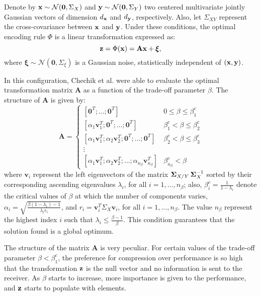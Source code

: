 Denote by $\mathbf{x}\sim \mathcal{N}(\mathbf{0}, \Sigma_{X})$ and $\mathbf{y}\sim \mathcal{N}(\mathbf{0}, \Sigma_{Y})$ two centered multivariate jointly Gaussian vectors of dimension $d_{\mathbf{x}}$ and $d_{\mathbf{y}}$, respectively. Also, let $\Sigma_{XY}$ represent the cross-covariance between $\mathbf{x}$ and $\mathbf{y}$. Under these conditions, the optimal encoding rule $\Phi$ is a linear transformation \cite{Chechik2004GIB} expressed as:
\begin{equation}
    \mathbf{z} = \Phi(\mathbf{x})  = \mathbf{A} \mathbf{x} + \boldsymbol{\xi},
\end{equation}
where $\boldsymbol{\xi} \sim  \mathcal{N}(\mathbf{0}, \Sigma_{\xi})$ is a Gaussian noise, statistically independent of $(\mathbf{x}, \mathbf{y})$.

In this configuration, Chechik et al. \cite{Chechik2004GIB} were able to evaluate the optimal transformation matrix $\mathbf{A}$ as a function of the trade-off parameter $\beta$. The structure of $\mathbf{A}$ is given by:
\begin{equation}
\mathbf{A} = \left\{\begin{matrix}
            [\mathbf{0}^T;...;\mathbf{0}^T] & 0 \leq \beta \leq \beta_1^c\\
            [\alpha_1\mathbf{v}_1^T; \mathbf{0}^T;...;\mathbf{0}^T] & \beta_1^c < \beta \leq \beta_2^c\\
            [\alpha_1 \mathbf{v}_1^T;\alpha_2\mathbf{v}_2^T;\mathbf{0}^T;\ldots;\mathbf{0}^T] & \beta_2^c < \beta \leq \beta_3^c\\
            \vdots\\
            [\alpha_1 \mathbf{v}_1^T;\alpha_2\mathbf{v}_2^T;\ldots;\alpha_{n_{\beta}}\mathbf{v}_{n_{\beta}}^T] & \beta_{n_{\beta}}^c < \beta 
            \end{matrix}\right.
\label{eq: SEMCOM Matrice_A}
\end{equation}
where $\mathbf{v}_i$ represent the left eigenvectors of the matrix $\boldsymbol{\Sigma}_{X/Y}\,\boldsymbol{\Sigma}_X^{-1}$ sorted by their corresponding ascending eigenvalues $\lambda_i$, for all $i=1, \ldots, n_{\beta}$; also, $\beta_i^c = \frac{1}{1-\lambda_i}$ denote the critical values of $\beta$ at which the number of components varies, $\alpha_i=\sqrt{\frac{\beta(1-\lambda_i)-1}{\lambda_i r_i}}$, and $r_i = \mathbf{v}_i^T\Sigma_{X} \mathbf{v}_i$,  for all $i=1, \ldots, n_{\beta}$. The value $n_{\beta}$ represent the highest index $i$ such that $\lambda_i \leq \frac{\beta-1}{\beta}$. This condition guarantees that the solution found is a global optimum.

The structure of the matrix $\mathbf{A}$ is very peculiar. For certain values of the trade-off parameter $\beta < \beta_1^c$, the preference for compression over performance is so high that the transformation $\mathbf{z}$ is the null vector and no information is sent to the receiver. As $\beta$ starts to increase, more importance is given to the performance, and $\mathbf{z}$ starts to populate with elements.


